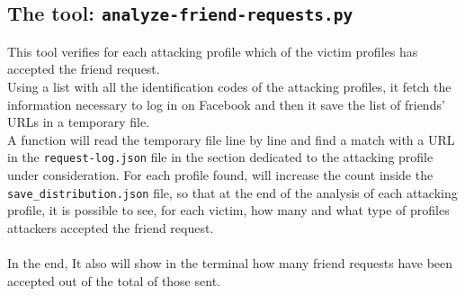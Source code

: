 \subsection{The tool: \texttt{analyze-friend-requests.py}}
This tool verifies for each attacking profile which of the victim profiles has accepted the friend request.\\
Using a list with all the identification codes of the attacking profiles, it fetch the information necessary to log in on Facebook and then it save the list of friends' URLs in a temporary file.\\A function will read the temporary file line by line and find a match with a URL in the \texttt{request-log.json} file in the section dedicated to the attacking profile under consideration. For each profile found, will increase the count inside the \texttt{save\_distribution.json} file, so that at the end of the analysis of each attacking profile, it is possible to see, for each victim, how many and what type of profiles attackers accepted the friend request.\\\\
In the end, It also will show in the terminal how many friend requests have been accepted out of the total of those sent.


